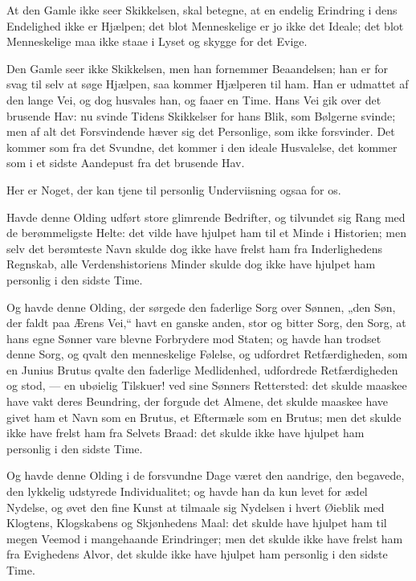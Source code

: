 \documentclass[12pt,a4paper]{book}
\newcommand{\apage}[1]{\marginnote{\footnotesize\textit{[#1]}}}
\begin{document}
At den Gamle ikke seer Skikkelsen, skal betegne, at en endelig Erindring i
dens Endelighed ikke er Hjælpen; det blot Menneskelige er jo ikke det
Ideale; det blot Menneskelige maa ikke staae i Lyset og skygge for det
Evige.

Den Gamle seer ikke Skikkelsen, men han fornemmer Beaandelsen; han er for
svag til selv at søge Hjælpen, saa kommer Hjælperen til ham. Han er
udmattet af den lange Vei, og dog husvales han, og faaer en Time. Hans Vei
gik over det brusende Hav: nu svinde Tidens Skikkelser for hans Blik, som
Bølgerne svinde; men af alt det Forsvindende hæver sig det Personlige, som
ikke forsvinder. Det kommer som fra det Svundne, det kommer i den ideale
Husvalelse, det kommer som i et sidste Aandepust fra det brusende Hav.

Her er Noget, der kan tjene til personlig Underviisning ogsaa for os.

Havde denne Olding udført store glimrende Bedrifter, og tilvundet sig Rang
med de berømmeligste Helte: det vilde have hjulpet ham til et Minde i
Historien; men selv det berømteste Navn skulde dog ikke have frelst ham fra
Inderlighedens Regnskab, alle Verdenshistoriens Minder skulde dog ikke have
hjulpet ham personlig i den sidste Time.

Og havde denne Olding, der sørgede den faderlige Sorg over Sønnen, „den
Søn, der faldt paa Ærens Vei,“ havt en ganske anden, stor og bitter Sorg,
den Sorg, at hans egne Sønner vare blevne Forbrydere mod Staten; og havde
han trodset denne Sorg, og qvalt den menneskelige Følelse, og udfordret
Retfærdigheden, som en Junius Brutus qvalte den faderlige Medlidenhed,
udfordrede Retfærdigheden og stod, --- en ubøielig Tilskuer! ved sine
Sønners Rettersted: det skulde maaskee have vakt deres Beundring, der
forgude det Almene, det skulde maaskee have givet ham et Navn som en
Brutus,
et Eftermæle som en Brutus; men det skulde ikke have frelst \apage{114} ham fra Selvets
Braad: det skulde ikke have hjulpet ham personlig i den sidste Time.

Og havde denne Olding i de forsvundne Dage været den aandrige, den
begavede, den lykkelig udstyrede Individualitet; og havde han da kun levet
for ædel Nydelse, og øvet den fine Kunst at tilmaale sig Nydelsen i hvert
Øieblik med Klogtens, Klogskabens og Skjønhedens Maal: det skulde have
hjulpet ham til megen Veemod i mangehaande Erindringer; men det skulde ikke
have frelst ham fra Evighedens Alvor, det skulde ikke have hjulpet ham
personlig i den sidste Time.
\end{document}
